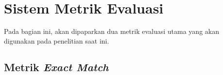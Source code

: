 \section{Sistem Metrik Evaluasi}
\label{2.8}
Pada bagian ini, akan dipaparkan dua metrik evaluasi utama yang akan digunakan pada penelitian saat ini.

\subsection{Metrik \emph{Exact Match}}
\label{2.8.1}

